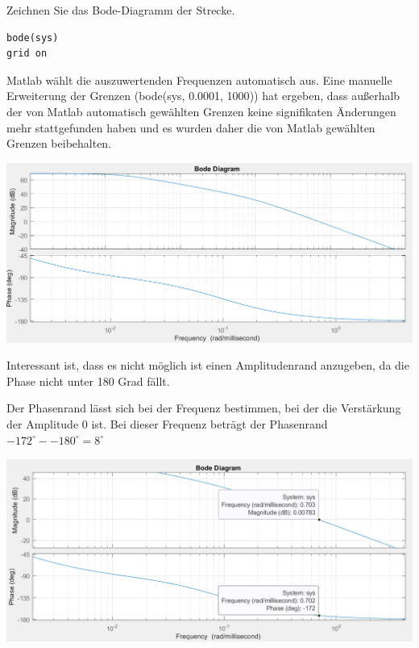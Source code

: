 \documentclass[            %
draft = false,             		%
paper = A4,                		%
pagesize = pdftex,         		%
fontsize = 10pt,           		%
DIV=15,                    		%
twoside = false,           		%
twocolumn = false,         		%
parskip = full,           		%
chapterprefix = false,      		%
appendixprefix = true,     		%
headinclude = false,       		%
footinclude = false,       		%
mpinclude = false,         		%
numbers = auto,            		%
cleardoublepage = plain,   		%
footnotes = multiple,      		%
titlepage = true,          		%
headings = normal,         		%
open = right,              		%
bibliography = openstyle,  		%
listof = chaptergapline,   		%
overfullrule = true,
]{scrbook}
\begin{document}
Zeichnen Sie das Bode-Diagramm der Strecke.

\begin{lstlisting}[style=CStyle]
bode(sys)
grid on
\end{lstlisting}

Matlab wählt die auszuwertenden Frequenzen automatisch aus. Eine manuelle Erweiterung der Grenzen (bode(sys, {0.0001, 1000}))
hat ergeben, dass außerhalb der von Matlab automatisch gewählten Grenzen keine signifikaten Änderungen mehr stattgefunden haben
und es wurden daher die von Matlab gewählten Grenzen beibehalten.

\begin{center}
   \begin{minipage}[b]{1.0\textwidth}
      \includegraphics[scale=0.7]{Bilder/Bodeplot.PNG}
      \label{fig:Bodeplot} 
   \end{minipage}
\end{center}

Interessant ist, dass es nicht möglich ist einen Amplitudenrand anzugeben, da die Phase nicht unter 180 Grad fällt.

Der Phasenrand lässt sich bei der Frequenz bestimmen, bei der die Verstärkung der Amplitude 0 ist.
Bei dieser Frequenz beträgt der Phasenrand $-172^{\circ} - -180^{\circ} = 8^{\circ} $

\begin{center}
   \begin{minipage}[b]{1.0\textwidth}
      \includegraphics[scale=0.7]{Bilder/Phasenrand.PNG}
      \label{fig:Phasenrand} 
   \end{minipage}
\end{center}
\end{document}
